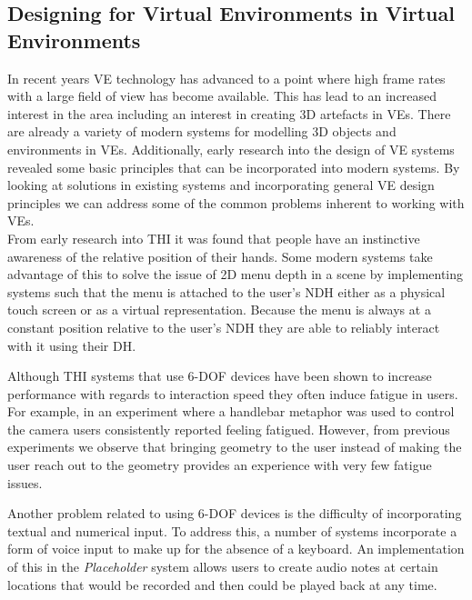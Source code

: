 \documentclass{sig-alternate-05-2015}
\begin{document}
\subsection{Designing for Virtual Environments in Virtual Environments}
In recent years VE technology has advanced to a point where high frame rates with a large field of view has become available. This has lead to an increased interest in the area including an interest in creating 3D artefacts in VEs. There are already a variety of modern systems for modelling 3D objects and environments in VEs. Additionally, early research into the design of VE systems revealed some basic principles that can be incorporated into modern systems. By looking at solutions in existing systems and incorporating general VE design principles we can address some of the common problems inherent to working with VEs.\\

From early research into THI it was found that people have an instinctive awareness of the relative position of their hands\cite{Bowman1998, Buxton1986}. Some modern systems take advantage of this to solve the issue of 2D menu depth in a scene by implementing systems such that the menu is attached to the user's NDH either as a physical touch screen\cite{Wang2013,Mine2014} or as a virtual representation\cite{Jerald2013}. Because the menu is always at a constant position relative to the user's NDH they are able to reliably interact with it using their DH.

Although THI systems that use 6-DOF devices have been shown to increase performance with regards to interaction speed\cite{Schultheis2012} they often induce fatigue in users. For example, in an experiment where a handlebar metaphor was used to control the camera users consistently reported feeling fatigued\cite{Song2012}. However, from previous experiments we observe that bringing geometry to the user instead of making the user reach out to the geometry provides an experience with very few fatigue issues\cite{Jerald2013}.

Another problem related to using 6-DOF devices is the difficulty of incorporating textual and numerical input. To address this, a number of systems incorporate a form of voice input to make up for the absence of a keyboard\cite{Ponto2013,Toma2012}. An implementation of this in the \textit{Placeholder} system\cite{Laurel1994} allows users to create audio notes at certain locations that would be recorded and then could be played back at any time.
\end{document}
